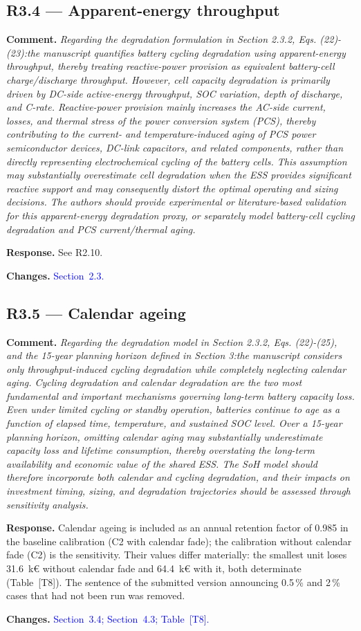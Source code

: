 \documentclass[11pt]{article}
\newcommand{\rcomment}[1]{\par\medskip\noindent\textbf{Comment.} \textit{#1}\par\smallskip}
\newcommand{\rresponse}[1]{\noindent\textbf{Response.} #1\par\smallskip}
\newcommand{\rchanges}[1]{\noindent\textbf{Changes.} \textcolor{blue}{#1}\par\medskip}
\begin{document}
\subsection*{R3.4 --- Apparent-energy throughput}
\rcomment{
Regarding the degradation formulation in Section 2.3.2, Eqs. (22)-(23):the manuscript quantifies battery cycling degradation using apparent-energy throughput, thereby treating reactive-power provision as equivalent battery-cell charge/discharge throughput. However, cell capacity degradation is primarily driven by DC-side active-energy throughput, SOC variation, depth of discharge, and C-rate. Reactive-power provision mainly increases the AC-side current, losses, and thermal stress of the power conversion system (PCS), thereby contributing to the current- and temperature-induced aging of PCS power semiconductor devices, DC-link capacitors, and related components, rather than directly representing electrochemical cycling of the battery cells. This assumption may substantially overestimate cell degradation when the ESS provides significant reactive support and may consequently distort the optimal operating and sizing decisions. The authors should provide experimental or literature-based validation for this apparent-energy degradation proxy, or separately model battery-cell cycling degradation and PCS current/thermal aging.
}
\rresponse{See R2.10.}
\rchanges{Section~2.3.}

\subsection*{R3.5 --- Calendar ageing}
\rcomment{
Regarding the degradation model in Section 2.3.2, Eqs. (22)-(25), and the 15-year planning horizon defined in Section 3:the manuscript considers only throughput-induced cycling degradation while completely neglecting calendar aging. Cycling degradation and calendar degradation are the two most fundamental and important mechanisms governing long-term battery capacity loss. Even under limited cycling or standby operation, batteries continue to age as a function of elapsed time, temperature, and sustained SOC level. Over a 15-year planning horizon, omitting calendar aging may substantially underestimate capacity loss and lifetime consumption, thereby overstating the long-term availability and economic value of the shared ESS. The SoH model should therefore incorporate both calendar and cycling degradation, and their impacts on investment timing, sizing, and degradation trajectories should be assessed through sensitivity analysis.
}
\rresponse{Calendar ageing is included as an annual retention factor of 0.985 in the baseline calibration
(C2 with calendar fade); the calibration without calendar fade (C2) is the sensitivity. Their values
differ materially: the smallest unit loses 31.6~k\euro{} without calendar fade and 64.4~k\euro{} with it,
both determinate (Table~[T8]). The sentence of the submitted version announcing 0.5\,\% and 2\,\% cases
that had not been run was removed.}
\rchanges{Section~3.4; Section~4.3; Table~[T8].}
\end{document}
